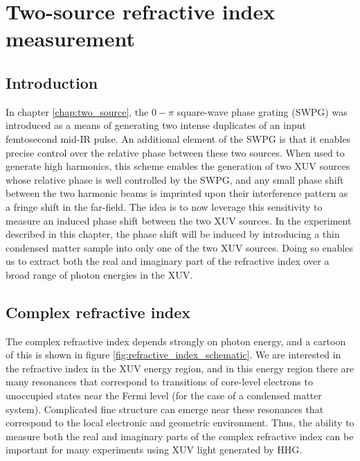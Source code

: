 \chapter{Two-source refractive index measurement}
\label{chap:refractive_index}

\section{Introduction}
\label{intro_ts}
In chapter \ref{chap:two_source}, the $0-\pi$ square-wave phase grating (SWPG) was introduced as a means of generating two intense duplicates of an input femtosecond mid-IR pulse.  An additional element of the SWPG is that it enables precise control over the relative phase between these two sources.  When used to generate high harmonics, this scheme enables the generation of two XUV sources whose relative phase is well controlled by the SWPG, and any small phase shift between the two harmonic beams is imprinted upon their interference pattern as a fringe shift in the far-field.  The idea is to now leverage this sensitivity to measure an induced phase shift between the two XUV sources.  In the experiment described in this chapter, the phase shift will be induced by introducing a thin condensed matter sample into only one of the two XUV sources.  Doing so enables us to extract both the real and imaginary part of the refractive index over a broad range of photon energies in the XUV.
\section{Complex refractive index}
The complex refractive index depends strongly on photon energy, and a cartoon of this is shown in figure \ref{fig:refractive_index_schematic}. We are interested in the refractive index in the XUV energy region, and in this energy region there are many resonances that correspond to transitions of core-level electrons to unoccupied states near the Fermi level (for the case of a condensed matter system)\cite{stohrNEXAFSSpectroscopy1992, attwoodSoftXraysExtreme2000}.  Complicated fine structure can emerge near these resonances that correspond to the local electronic and geometric environment\cite{stohrNEXAFSSpectroscopy1992, attwoodSoftXraysExtreme2000}.  Thus, the ability to measure both the real and imaginary parts of the complex refractive index can be important for many experiments using XUV light generated by HHG\cite{kaplanFemtosecondTrackingCarrier2018,  cirriAchievingSurfaceSensitivity2017}.

